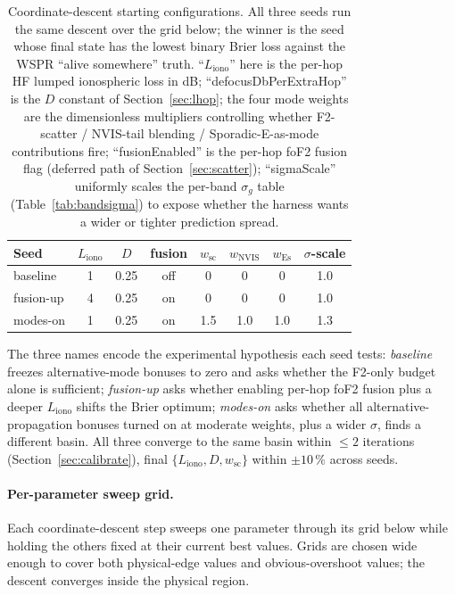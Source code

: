 \documentclass[11pt,a4paper]{article}
\begin{document}
\begin{table}[H]
\centering
\small
\caption{Coordinate-descent starting configurations.  All three
seeds run the same descent over the grid below; the winner is the
seed whose final state has the lowest binary Brier loss against
the WSPR ``alive somewhere'' truth.  ``$L_{\text{iono}}$'' here is
the per-hop HF lumped ionospheric loss in dB;
``defocusDbPerExtraHop'' is the $D$ constant of
Section~\ref{sec:lhop}; the four mode weights are the dimensionless
multipliers controlling whether F2-scatter / NVIS-tail blending /
Sporadic-E-as-mode contributions fire; ``fusionEnabled'' is the
per-hop foF2 fusion flag (deferred path of
Section~\ref{sec:scatter}); ``sigmaScale'' uniformly scales the
per-band $\sigma_g$ table (Table~\ref{tab:bandsigma}) to expose
whether the harness wants a wider or tighter prediction
spread.}
\label{tab:seeds}
\begin{tabular}{@{}lccccccc@{}}
\toprule
\textbf{Seed} & \textbf{$L_{\text{iono}}$} & \textbf{$D$} &
  \textbf{fusion} & \textbf{$w_{\text{sc}}$} &
  \textbf{$w_{\text{NVIS}}$} & \textbf{$w_{\text{Es}}$} &
  \textbf{$\sigma$-scale} \\
\midrule
baseline   & 1 & 0.25 & off & 0   & 0   & 0   & 1.0 \\
fusion-up  & 4 & 0.25 & on  & 0   & 0   & 0   & 1.0 \\
modes-on   & 1 & 0.25 & on  & 1.5 & 1.0 & 1.0 & 1.3 \\
\bottomrule
\end{tabular}
\end{table}

The three names encode the experimental hypothesis each seed
tests: \emph{baseline} freezes alternative-mode bonuses to zero
and asks whether the F2-only budget alone is sufficient;
\emph{fusion-up} asks whether enabling per-hop foF2 fusion plus a
deeper $L_{\text{iono}}$ shifts the Brier optimum; \emph{modes-on}
asks whether all alternative-propagation bonuses turned on at
moderate weights, plus a wider $\sigma$, finds a different basin.
All three converge to the same basin within ${\le}2$ iterations
(Section~\ref{sec:calibrate}), final
$\{L_{\text{iono}}, D, w_{\text{sc}}\}$ within $\pm 10\,\%$ across
seeds.

\paragraph{Per-parameter sweep grid.}  Each coordinate-descent step
sweeps one parameter through its grid below while holding the
others fixed at their current best values.  Grids are chosen wide
enough to cover both physical-edge values and obvious-overshoot
values; the descent converges inside the physical region.
\end{document}
